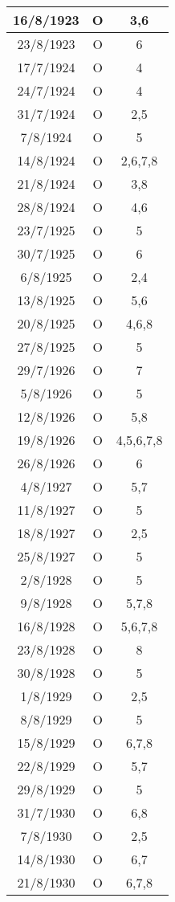 \begin{longtable}{|c|c|c|c|c|c|c|c|c|c|c|c|c|c|}
\hline
	16/8/1923	 &
	O &
	\multicolumn{12}{c|}{3,6}
	\tabularnewline
\hline
	23/8/1923	 &
	O &
	\multicolumn{12}{c|}{6}
	\tabularnewline
\hline
	17/7/1924	 &
	O &
	\multicolumn{12}{c|}{4}
	\tabularnewline
\hline
	24/7/1924	 &
	O &
	\multicolumn{12}{c|}{4}
	\tabularnewline
\hline
	31/7/1924	 &
	O &
	\multicolumn{12}{c|}{2,5}
	\tabularnewline
\hline
	7/8/1924	 &
	O &
	\multicolumn{12}{c|}{5}
	\tabularnewline
\hline
	14/8/1924	 &
	O &
	\multicolumn{12}{c|}{2,6,7,8}
	\tabularnewline
\hline
	21/8/1924	 &
	O &
	\multicolumn{12}{c|}{3,8}
	\tabularnewline
\hline
	28/8/1924	 &
	O &
	\multicolumn{12}{c|}{4,6}
	\tabularnewline
\hline
	23/7/1925	 &
	O &
	\multicolumn{12}{c|}{5}
	\tabularnewline
\hline
	30/7/1925	 &
	O &
	\multicolumn{12}{c|}{6}
	\tabularnewline
\hline
	6/8/1925	 &
	O &
	\multicolumn{12}{c|}{2,4}
	\tabularnewline
\hline
	13/8/1925	 &
	O &
	\multicolumn{12}{c|}{5,6}
	\tabularnewline
\hline
	20/8/1925	 &
	O &
	\multicolumn{12}{c|}{4,6,8}
	\tabularnewline
\hline
	27/8/1925	 &
	O &
	\multicolumn{12}{c|}{5}
	\tabularnewline
\hline
	29/7/1926	 &
	O &
	\multicolumn{12}{c|}{7}
	\tabularnewline
\hline
	5/8/1926	 &
	O &
	\multicolumn{12}{c|}{5}
	\tabularnewline
\hline
	12/8/1926	 &
	O &
	\multicolumn{12}{c|}{5,8}
	\tabularnewline
\hline
	19/8/1926	 &
	O &
	\multicolumn{12}{c|}{4,5,6,7,8}
	\tabularnewline
\hline
	26/8/1926	 &
	O &
	\multicolumn{12}{c|}{6}
	\tabularnewline
\hline
	4/8/1927	 &
	O &
	\multicolumn{12}{c|}{5,7}
	\tabularnewline
\hline
	11/8/1927	 &
	O &
	\multicolumn{12}{c|}{5}
	\tabularnewline
\hline
	18/8/1927	 &
	O &
	\multicolumn{12}{c|}{2,5}
	\tabularnewline
\hline
	25/8/1927	 &
	O &
	\multicolumn{12}{c|}{5}
	\tabularnewline
\hline
	2/8/1928	 &
	O &
	\multicolumn{12}{c|}{5}
	\tabularnewline
\hline
	9/8/1928	 &
	O &
	\multicolumn{12}{c|}{5,7,8}
	\tabularnewline
\hline
	16/8/1928	 &
	O &
	\multicolumn{12}{c|}{5,6,7,8}
	\tabularnewline
\hline
	23/8/1928	 &
	O &
	\multicolumn{12}{c|}{8}
	\tabularnewline
\hline
	30/8/1928	 &
	O &
	\multicolumn{12}{c|}{5}
	\tabularnewline
\hline
	1/8/1929	 &
	O &
	\multicolumn{12}{c|}{2,5}
	\tabularnewline
\hline
	8/8/1929	 &
	O &
	\multicolumn{12}{c|}{5}
	\tabularnewline
\hline
	15/8/1929	 &
	O &
	\multicolumn{12}{c|}{6,7,8}
	\tabularnewline
\hline
	22/8/1929	 &
	O &
	\multicolumn{12}{c|}{5,7}
	\tabularnewline
\hline
	29/8/1929	 &
	O &
	\multicolumn{12}{c|}{5}
	\tabularnewline
\hline
	31/7/1930	 &
	O &
	\multicolumn{12}{c|}{6,8}
	\tabularnewline
\hline
	7/8/1930	 &
	O &
	\multicolumn{12}{c|}{2,5}
	\tabularnewline
\hline
	14/8/1930	 &
	O &
	\multicolumn{12}{c|}{6,7}
	\tabularnewline
\hline
	21/8/1930	 &
	O &
	\multicolumn{12}{c|}{6,7,8}

\end{longtable}
